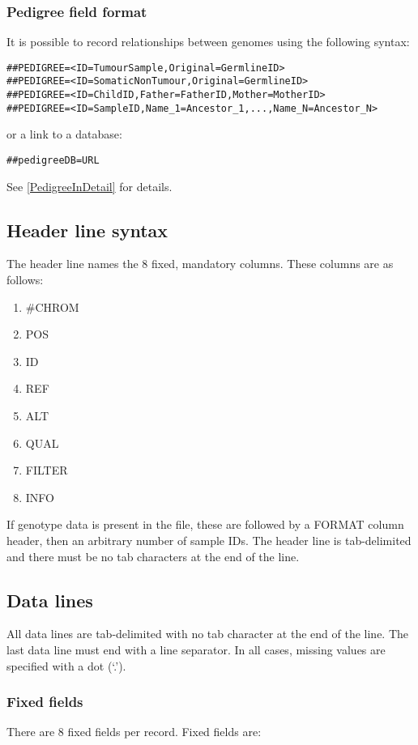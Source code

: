 \documentclass[8pt]{article}
\begin{document}
\subsubsection{Pedigree field format}
It is possible to record relationships between genomes using the following syntax:
\begin{verbatim}
##PEDIGREE=<ID=TumourSample,Original=GermlineID>
##PEDIGREE=<ID=SomaticNonTumour,Original=GermlineID>
##PEDIGREE=<ID=ChildID,Father=FatherID,Mother=MotherID>
##PEDIGREE=<ID=SampleID,Name_1=Ancestor_1,...,Name_N=Ancestor_N>
\end{verbatim}
\noindent or a link to a database:
\begin{verbatim}
##pedigreeDB=URL
\end{verbatim}

\noindent See \ref{PedigreeInDetail} for details.


\subsection{Header line syntax}
The header line names the 8 fixed, mandatory columns. These columns are as follows:

\begin{enumerate}
  \item \#CHROM
  \item POS
  \item ID
  \item REF
  \item ALT
  \item QUAL
  \item FILTER
  \item INFO
\end{enumerate}

If genotype data is present in the file, these are followed by a FORMAT column header, then an arbitrary number of sample IDs. The header line is tab-delimited
and there must be no tab characters at the end of the line.

\subsection{Data lines}
\label{data-lines}
All data lines are tab-delimited
with no tab character at the end of the line. The last data line must end with a line separator. In all cases,
missing values are specified with a dot (`.').

\subsubsection{Fixed fields}
There are 8 fixed fields per record.  Fixed fields are:
\end{document}
